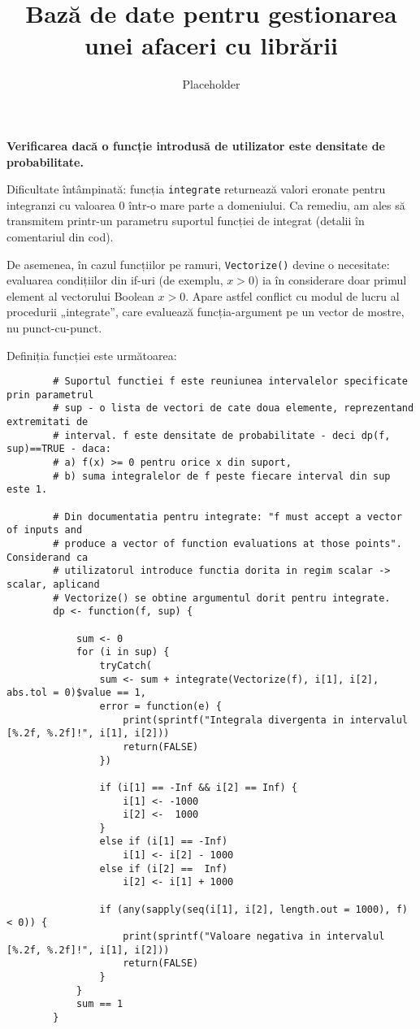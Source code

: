 \documentclass[12pt]{article}
\title{Bază de date pentru gestionarea unei afaceri cu librării}
\author{Placeholder}
\begin{document}
	\textbf{Verificarea dacă o funcție introdusă de utilizator este densitate de probabilitate.}\vspace{5mm}
	
	Dificultate întâmpinată: funcția \lstinline|integrate| returnează valori eronate pentru integranzi cu valoarea $0$ într-o mare parte a domeniului. Ca remediu, am ales să transmitem printr-un parametru suportul funcției de integrat (detalii în comentariul din cod).\par
	De asemenea, în cazul funcțiilor pe ramuri, \lstinline|Vectorize()| devine o necesitate: evaluarea condițiilor din if-uri (de exemplu, $x > 0$) ia în considerare doar primul element al vectorului Boolean $x > 0$. Apare astfel conflict cu modul de lucru al procedurii „integrate”, care evaluează funcția-argument pe un vector de mostre, nu punct-cu-punct.\par
	Definiția funcției este următoarea: \\
	
	\begin{lstlisting}
		# Suportul functiei f este reuniunea intervalelor specificate prin parametrul
		# sup - o lista de vectori de cate doua elemente, reprezentand extremitati de
		# interval. f este densitate de probabilitate - deci dp(f, sup)==TRUE - daca:
		# a) f(x) >= 0 pentru orice x din suport,
		# b) suma integralelor de f peste fiecare interval din sup este 1.
		
		# Din documentatia pentru integrate: "f must accept a vector of inputs and
		# produce a vector of function evaluations at those points". Considerand ca
		# utilizatorul introduce functia dorita in regim scalar -> scalar, aplicand
		# Vectorize() se obtine argumentul dorit pentru integrate.
		dp <- function(f, sup) {
			
			sum <- 0
			for (i in sup) {
				tryCatch(
				sum <- sum + integrate(Vectorize(f), i[1], i[2], abs.tol = 0)$value == 1,
				error = function(e) {
					print(sprintf("Integrala divergenta in intervalul [%.2f, %.2f]!", i[1], i[2]))
					return(FALSE)
				})
				
				if (i[1] == -Inf && i[2] == Inf) {
					i[1] <- -1000
					i[2] <-  1000
				}
				else if (i[1] == -Inf)
					i[1] <- i[2] - 1000
				else if (i[2] ==  Inf)
					i[2] <- i[1] + 1000
				
				if (any(sapply(seq(i[1], i[2], length.out = 1000), f) < 0)) {
					print(sprintf("Valoare negativa in intervalul [%.2f, %.2f]!", i[1], i[2]))
					return(FALSE)
				}
			}
			sum == 1
		}
	\end{lstlisting}\vspace*{3\baselineskip} 
\end{document}
